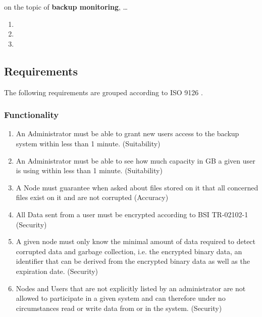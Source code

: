 \begin{flushright}
on the topic of \textbf{backup monitoring}, \ldots{}
\end{flushright}

\begin{enumerate}
	\enumcountrestore
	\item {}
	\item {}
	\item {}
\end{enumerate}


\subsection{Requirements}

The following requirements are grouped according to ISO 9126 \cite{ISO9126}.

\subsubsection{Functionality}

\begin{enumerate}
	\item An Administrator must be able to grant new users access to the backup system within less than 1 minute. (Suitability)
	\item An Administrator must be able to see how much capacity in GB a given user is using within less than 1 minute. (Suitability)
	\item A Node must guarantee when asked about files stored on it that all concerned files exist on it and are not corrupted (Accuracy)
	\item All Data sent from a user must be encrypted according to BSI TR-02102-1 \cite{bsi-tr-02102-1} (Security)
	\item A given node must only know the minimal amount of data required to detect corrupted data and garbage collection, i.e. the encrypted binary data, an identifier that can be derived from the encrypted binary data as well as the expiration date. (Security)
	\item Nodes and Users that are not explicitly listed by an administrator are not allowed to participate in a given system and can therefore under no circumstances read or write data from or in the system. (Security)
	\enumcountsave
\end{enumerate}

